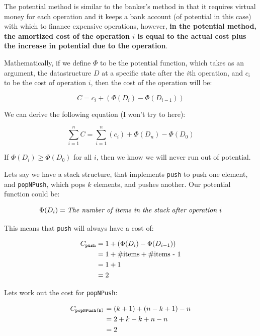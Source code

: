 
The potential method is similar to the banker's method in that it requires
virtual money for each operation and it keeps a bank account (of potential in
this case) with which to finance expensive operations, however, \textbf{in the
potential method, the amortized cost of the operation $i$ is equal to the actual
cost plus the increase in potential due to the operation}.

Mathematically, if we define $\Phi$ to be the potential function, which takes as
an argument, the datastructure $D$ at a specific state after the $i$th
operation, and $c_i$ to be the cost of operation $i$, then the cost of the
operation will be:

\[
  C = c_i + \left(\Phi(D_i) - \Phi(D_{i-1})\right)
\]

We can derive the following equation (I won't try to here):

\[
  \sum\limits_{i=1}^n C = \sum\limits_{i=1}^n \left( c_i \right) + \Phi(D_n) - \Phi(D_{0})
\]

If $\Phi(D_i) \geq \Phi(D_0)$ for all $i$, then we know we will never run out of
potential.

Lets say we have a stack structure, that implements \texttt{push} to push one
element, and \texttt{popNPush}, which pops $k$ elements, and pushes another. Our
potential function could be: 

\[
  \Phi(D_i) = \text{\textit{The number of items in the stack after operation $i$}}
\]

This means that \texttt{push} will always have a cost of:

\begin{align*}
  C_{\text{\texttt{push}}} &= 1 + \left(\Phi(D_i) - \Phi(D_{i-1})\right)\\
                           &= 1 + \text{\#items} + \text{\#items - 1}\\
                           &= 1 + 1\\
                           &= 2
\end{align*}

Lets work out the cost for \texttt{popNPush}:

\begin{align*}
  C_{\text{\texttt{popNPush(k)}}} &= (k + 1) + (n - k + 1) - n\\
                                  &= 2 + k - k + n - n\\
                                  &= 2
\end{align*}

